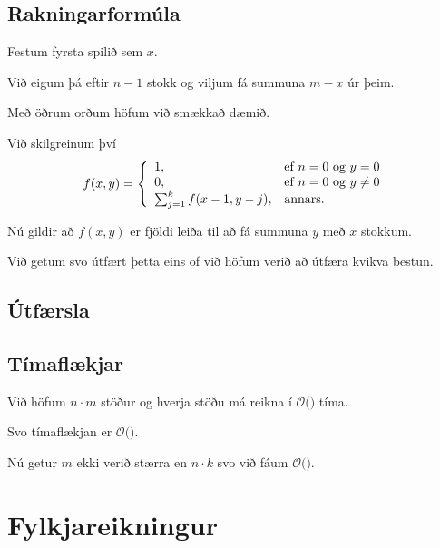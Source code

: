 \subsection{Rakningarformúla}
{
    {
    \item<1-> Festum fyrsta spilið sem $x$.
    \item<2-> Við eigum þá eftir $n - 1$ stokk og viljum fá summuna $m - x$ úr þeim.
    \item<3-> Með öðrum orðum höfum við smækkað dæmið.
    \item<4-> Við skilgreinum því
        \[
            f(x, y) = \left \{
                \env{array}
                { {l l}
                1, & \text{ef $n = 0$ og $y = 0$}\\
                0, & \text{ef $n = 0$ og $y \neq 0$}\\
                \sum_{j = 1}^k f(x - 1, y - j), & \text{annars}.
                }
                \right .
            \]
        \item<5-> Nú gildir að $f(x, y)$ er fjöldi leiða til að fá summuna $y$ með $x$ stokkum.
        \item<6-> Við getum svo útfært þetta eins of við höfum verið að útfæra kvikva bestun.
    }
}

\subsection{Útfærsla}
{
}

\subsection{Tímaflækjar}
{
    {
        \item<1-> Við höfum $n \cdot m$ stöður og hverja stöðu má reikna í $\mathcal{O}($$)$ tíma.
        \item<3-> Svo tímaflækjan er $\mathcal{O}($$)$.
        \item<5-> Nú getur $m$ ekki verið stærra en $n \cdot k$ svo við fáum $\mathcal{O}($$)$.
    }
}


\section{Fylkjareikningur}
